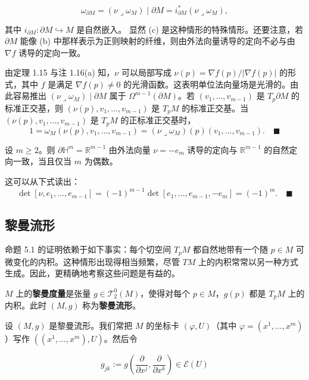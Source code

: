 \begin{example}
\begin{items}
\[
\omega_{\partial M} = (\nu \lrcorner \omega_{M}) \mid \partial M = i^{*}_{\partial M}(\nu \lrcorner \omega_{M}) ,
\]

其中 $ i_{\partial M}: \partial M \hookrightarrow M $ 是自然嵌入。
显然 (c) 是这种情形的特殊情形。还要注意，若 $ \partial M $ 能像 (b) 中那样表示为正则映射的纤维，则由外法向量诱导的定向不必与由 $ \nabla f $ 诱导的定向一致。

\proofhead
由定理 1.15 与注 1.16(a) 知，$ \nu $ 可以局部写成 $ \nu(p) = \nabla f(p)/|\nabla f(p)| $ 的形式，其中 $ f $ 是满足 $ \nabla f(p) \ne 0 $ 的光滑函数。这表明单位法向量场是光滑的。由此容易推出 $ (\nu \lrcorner \omega_{M}) \mid \partial M $ 属于 $ \Omega^{m-1}(\partial M) $。若 $ (v_{1}, \ldots, v_{m-1}) $ 是 $ T_{p}\partial M $ 的标准正交基，则 $ (\nu(p), v_{1}, \ldots, v_{m-1}) $ 是 $ T_{p}M $ 的标准正交基。当 $ (\nu(p), v_{1}, \ldots, v_{m-1}) $ 是 $ T_{p}M $ 的正标准正交基时，
\[
1 = \omega_{M}(\nu(p), v_{1}, \ldots, v_{m-1}) = (\nu \lrcorner \omega_{M})(p)(v_{1}, \ldots, v_{m-1}) .\quad\blacksquare
\]
\item[（h）]

设 $ m \ge 2 $。则 $ \partial\mathbb{H}^{m} = \mathbb{R}^{m-1} $ 由外法向量 $ \nu = -e_{m} $ 诱导的定向与 $ \mathbb{R}^{m-1} $ 的自然定向一致，当且仅当 $ m $ 为偶数。

\proofhead
这可以从下式读出：
\[
\det[\nu, e_{1}, \ldots, e_{m-1}] = (-1)^{m-1}\det[e_{1}, \ldots, e_{m-1}, -e_{m}] = (-1)^{m} .\quad\blacksquare
\]
\end{items}

\end{example}

\subsection*{黎曼流形}

命题 5.1 的证明依赖于如下事实：每个切空间 $ T_{p}M $ 都自然地带有一个随 $ p \in M $ 可微变化的内积。这种情形出现得相当频繁，尽管 $ TM $ 上的内积常常以另一种方式生成。因此，更精确地考察这些问题是有益的。

$ M $ 上的\textbf{黎曼度量}是张量 $ g \in \mathcal{T}^{0}_{2}(M) $，使得对每个 $ p \in M $，$ g(p) $ 都是 $ T_{p}M $ 上的内积。此时 $ (M, g) $ 称为\textbf{黎曼流形}。

设 $ (M, g) $ 是黎曼流形。我们常把 $ M $ 的坐标卡 $ (\varphi, U) $（其中 $ \varphi = (x^{1}, \ldots, x^{m}) $）写作 $ ((x^{1}, \ldots, x^{m}), U) $。然后令

\begin{equation}
g_{jk} := g\left(\frac{\partial}{\partial x^{j}}, \frac{\partial}{\partial x^{k}}\right) \in \mathcal{E}(U)\tag{5.3}
\end{equation}

